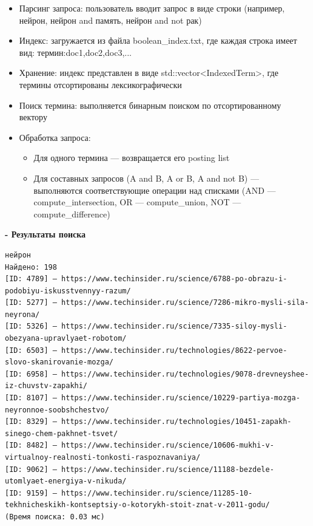 \documentclass[pdf, unicode, 12pt, a4paper, oneside, fleqn]{article}
\begin{document}
\begin{itemize}
    \item Парсинг запроса: пользователь вводит запрос в виде строки (например, нейрон, нейрон and память, нейрон and not рак)
    \item Индекс: загружается из файла boolean\_index.txt, где каждая строка имеет вид: термин:doc1,doc2,doc3,...
    \item Хранение: индекс представлен в виде std::vector<IndexedTerm>, где термины отсортированы лексикографически
    \item Поиск термина: выполняется бинарным поиском по отсортированному вектору
    \item Обработка запроса: 
    \begin{itemize}
        \item Для одного термина — возвращается его posting list
        \item Для составных запросов (A and B, A or B, A and not B) — выполняются соответствующие операции над списками (AND — compute\_intersection, OR — compute\_union, NOT — compute\_difference)
    \end{itemize}
\end{itemize}

\textbf{- Результаты поиска}

\begin{verbatim}
нейрон
Найдено: 198
[ID: 4789] — https://www.techinsider.ru/science/6788-po-obrazu-i-podobiyu-iskusstvennyy-razum/
[ID: 5277] — https://www.techinsider.ru/science/7286-mikro-mysli-sila-neyrona/
[ID: 5326] — https://www.techinsider.ru/science/7335-siloy-mysli-obezyana-upravlyaet-robotom/
[ID: 6503] — https://www.techinsider.ru/technologies/8622-pervoe-slovo-skanirovanie-mozga/
[ID: 6958] — https://www.techinsider.ru/technologies/9078-drevneyshee-iz-chuvstv-zapakhi/
[ID: 8107] — https://www.techinsider.ru/science/10229-partiya-mozga-neyronnoe-soobshchestvo/
[ID: 8329] — https://www.techinsider.ru/technologies/10451-zapakh-sinego-chem-pakhnet-tsvet/
[ID: 8482] — https://www.techinsider.ru/science/10606-mukhi-v-virtualnoy-realnosti-tonkosti-raspoznavaniya/
[ID: 9062] — https://www.techinsider.ru/science/11188-bezdele-utomlyaet-energiya-v-nikuda/
[ID: 9159] — https://www.techinsider.ru/science/11285-10-tekhnicheskikh-kontseptsiy-o-kotorykh-stoit-znat-v-2011-godu/
(Время поиска: 0.03 мс)
\end{verbatim}
\end{document}
